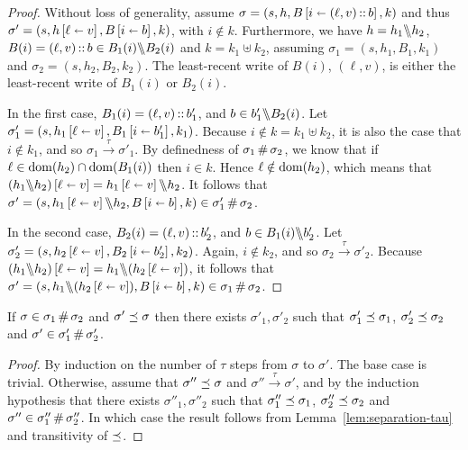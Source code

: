 \documentclass[11pt]{article}
\begin{document}
\begin{proof}
	Without loss of generality, assume $\sigma = (s,h,B \left[ i \shortleftarrow (\ell,v)\operatorname{:\!:} b \right],k)$ and thus $\sigma' = (s,h \left[ \ell \shortleftarrow v \right],B \left[ i \shortleftarrow b \right],k)$, with $i \notin k$. Furthermore, we have $h = h_1 \backslash\!\!\backslash h_2$, $B(i) = (\ell,v) \operatorname{:\!:} b \in B_1(i) \backslash\!\!\backslash B_2(i)$ and $k = k_1 \uplus k_2$, assuming $\sigma_1 = (s,h_1,B_1,k_1)$ and $\sigma_2 = (s,h_2,B_2,k_2)$. The least-recent write of $B(i)$, $(\ell,v)$, is either the least-recent write of $B_1(i)$ or $B_2(i)$. 

	In the first case, $B_1(i) = (\ell,v) \operatorname{:\!:} b_1'$, and $b \in b'_1 \backslash\!\!\backslash B_2(i)$. Let $\sigma'_1 = (s,h_1 \left[ \ell \shortleftarrow v \right],B_1 \left[ i \shortleftarrow b'_1 \right],k_1)$. Because $i \notin k = k_1 \uplus k_2$, it is also the case that $i \notin k_1$, and so $\sigma_1 \stackrel{\tau}{\rightarrow} \sigma'_1$. By definedness of $\sigma_1 \operatorname{\#} \sigma_2$, we know that if $\ell \in \operatorname{\mathrm{dom}}(h_2) \cap \operatorname{\mathrm{dom}}(B_1(i))$ then $i \in k$. Hence $\ell \notin \operatorname{\mathrm{dom}}(h_2)$, which means that $(h_1 \backslash\!\!\backslash h_2) \left[ \ell \shortleftarrow v \right] = h_1 \left[ \ell \shortleftarrow v \right] \backslash\!\!\backslash h_2$. It follows that $\sigma' = (s,h_1 \left[ \ell \shortleftarrow v \right] \backslash\!\!\backslash h_2, B \left[ i \shortleftarrow b \right],k) \in \sigma'_1 \operatorname{\#} \sigma_2$. 

	In the second case, $B_2(i) = (\ell,v) \operatorname{:\!:} b'_2$, and $b \in B_1(i) \backslash\!\!\backslash b'_2$. Let $\sigma'_2 = (s,h_2 \left[ \ell \shortleftarrow v \right],B_2 \left[ i \shortleftarrow b'_2 \right],k_2)$. Again, $i \notin k_2$, and so $\sigma_2 \stackrel{\tau}{\rightarrow} \sigma'_2$. Because $(h_1 \backslash\!\!\backslash h_2) \left[ \ell \shortleftarrow v \right] = h_1 \backslash\!\!\backslash (h_2 \left[ \ell \shortleftarrow v \right])$, it follows that $\sigma' = (s,h_1 \backslash\!\!\backslash (h_2 \left[ \ell \shortleftarrow v \right]),B \left[ i \shortleftarrow b \right],k) \in \sigma_1 \operatorname{\#} \sigma_2$. 
\end{proof}

\begin{lemma}
	\label{lem:separation-refinement}
	If $\sigma \in \sigma_1 \operatorname{\#} \sigma_2$ and $\sigma' \preceq \sigma$ then there exists $\sigma'_1,\sigma'_2$ such that $\sigma'_1 \preceq \sigma_1$, $\sigma'_2 \preceq \sigma_2$ and $\sigma' \in \sigma'_1 \operatorname{\#} \sigma'_2$. 
\end{lemma}

\begin{proof}
	By induction on the number of $\tau$ steps from $\sigma$ to $\sigma'$. The base case is trivial. Otherwise, assume that $\sigma'' \preceq \sigma$ and $\sigma'' \stackrel{\tau}{\rightarrow} \sigma'$, and by the induction hypothesis that there exists $\sigma''_1,\sigma''_2$ such that $\sigma''_1 \preceq \sigma_1$, $\sigma''_2 \preceq \sigma_2$ and $\sigma'' \in \sigma''_1 \operatorname{\#} \sigma''_2$. In which case the result follows from Lemma~\ref{lem:separation-tau} and transitivity of $\preceq$.
\end{proof}
\end{document}
